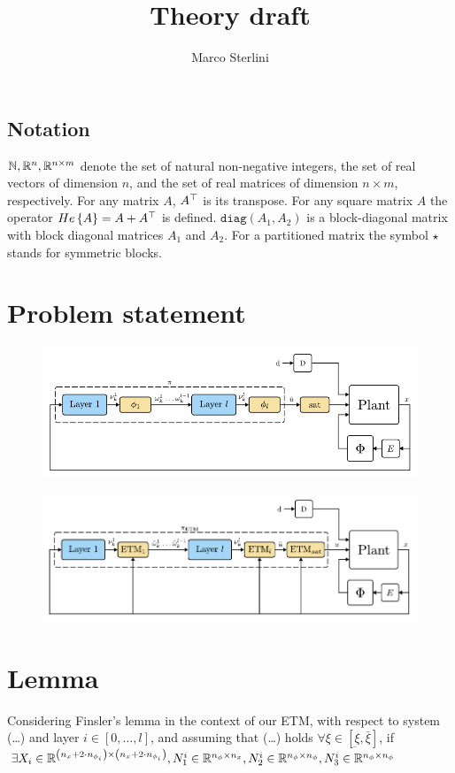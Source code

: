 \documentclass{article}
\begin{document}
\date{}
\author{Marco Sterlini}

\title{Theory draft}
\maketitle

\subsection*{\textbf{Notation}}
${\mathbb{N}}, {\mathbb{R}}^{n}, {\mathbb{R}}^{n \times m}$ denote the set of natural non-negative integers, the set of real vectors of dimension $n$, and the set of real matrices of dimension $n \times m$, respectively. For any matrix $A$, $A^\top$ is its transpose. For any square matrix $A$ the operator $He\left\{ A \right\} = A + A^\top$ is defined. $\texttt{diag}(A_1, A_2)$ is a block-diagonal matrix with block diagonal matrices $A_1$ and $A_2$. For a partitioned matrix the symbol $\star$ stands for symmetric blocks.
\section*{Problem statement}

\begin{figure}[H]
    \centering
    \includegraphics[width=\textwidth]{img/first_scheme}
    \caption{}
    \label{}
\end{figure}

\begin{figure}[H]
    \centering
    \includegraphics[width=\textwidth]{img/second_scheme}
    \caption{}
    \label{}
\end{figure}

\section*{\textbf{Lemma}}
Considering Finsler's lemma in the context of our ETM, with respect to system (\dots) and layer $i \in \left[ 0, \dots, l \right]$, and assuming that (\dots) holds $\forall \xi \in \left[ \underbar{\xi},  \bar{\xi} \right]$, if $\exists X_i \in {\mathbb{R}}^{\left( n_x + 2 \cdot n_{\phi_i} \right) \times\left( n_x + 2 \cdot n_{\phi_i} \right)}, N_{1}^{i} \in {\mathbb{R}}^{n_{\phi} \times n_x}, N_2^i \in {\mathbb{R}}^{n_{\phi} \times n_{\phi}}, N_3^i \in {\mathbb{R}}^{n_{\phi} \times n_{\phi}}$
\end{document}
